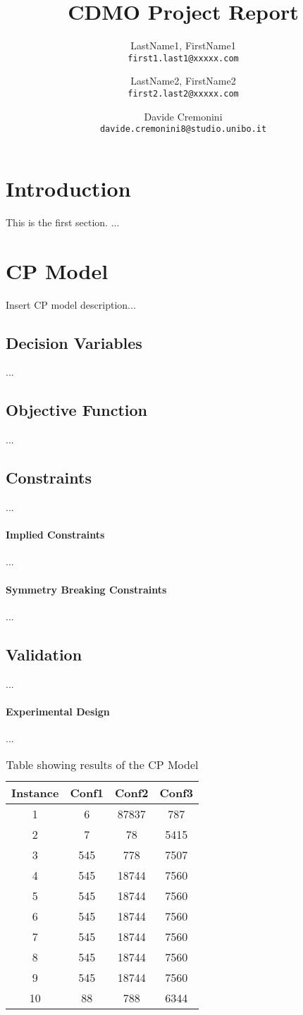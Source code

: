 \documentclass{article}
\title{CDMO Project Report}
\author{
  LastName1, FirstName1\\
  \texttt{first1.last1@xxxxx.com}
  \and
  LastName2, FirstName2\\
  \texttt{first2.last2@xxxxx.com}
  \and
  Davide Cremonini\\
  \texttt{davide.cremonini8@studio.unibo.it}
}
\begin{document}
\maketitle
\section{Introduction}

This is the first section.
...

\section{CP Model}
Insert CP model description...
\subsection{Decision Variables}
...
\subsection{Objective Function}
...
\subsection{Constraints}
...
\paragraph{Implied Constraints}
...
\paragraph{Symmetry Breaking Constraints}
...
\subsection{Validation}
...
\paragraph{Experimental Design}
...
\begin{table}[h!]
\centering
\begin{tabular}{|c | c c c|} 
 \hline
 Instance & Conf1 & Conf2 & Conf3\\ [0.5ex] 
 \hline\hline
 1 & 6 & 87837 & 787 \\ 
 2 & 7 & 78 & 5415 \\
 3 & 545 & 778 & 7507 \\
 4 & 545 & 18744 & 7560 \\
 5 & 545 & 18744 & 7560 \\
 6 & 545 & 18744 & 7560 \\
 7 & 545 & 18744 & 7560 \\
 8 & 545 & 18744 & 7560 \\
 9 & 545 & 18744 & 7560 \\
 10 & 88 & 788 & 6344 \\ [1ex] 
 \hline
\end{tabular}
\caption{Table showing results of the CP Model}
\label{table:1}
\end{table}
\end{document}
